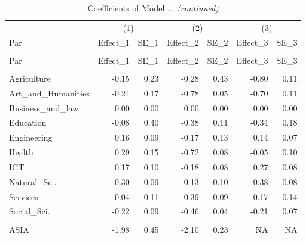 
\begin{longtable}[t]{lrrrrrr}
\caption{Coefficients of Model ...}\\
\toprule
\multicolumn{1}{c}{ } & \multicolumn{2}{c}{(1)} & \multicolumn{2}{c}{(2)} & \multicolumn{2}{c}{(3)} \\
\cmidrule(l{3pt}r{3pt}){2-3} \cmidrule(l{3pt}r{3pt}){4-5} \cmidrule(l{3pt}r{3pt}){6-7}
Par & Effect\_1 & SE\_1 & Effect\_2 & SE\_2 & Effect\_3 & SE\_3\\
\midrule
\endfirsthead
\caption[]{Coefficients of Model ... \textit{(continued)}}\\
\toprule
Par & Effect\_1 & SE\_1 & Effect\_2 & SE\_2 & Effect\_3 & SE\_3\\
\midrule
\endhead

\endfoot
\bottomrule
\endlastfoot
\addlinespace[0.3em]
\multicolumn{7}{l}{\textit{\textbf{Panel A: }}}\\
\hspace{1em}Agriculture & -0.15 & 0.23 & -0.28 & 0.43 & -0.80 & 0.11\\
\hspace{1em}Art\_and\_Humanities & -0.24 & 0.17 & -0.78 & 0.05 & -0.70 & 0.11\\
\hspace{1em}Business\_and\_law & 0.00 & 0.00 & 0.00 & 0.00 & 0.00 & 0.00\\
\hspace{1em}Education & -0.08 & 0.40 & -0.38 & 0.11 & -0.34 & 0.18\\
\hspace{1em}Engineering & 0.16 & 0.09 & -0.17 & 0.13 & 0.14 & 0.07\\
\hspace{1em}Health & 0.29 & 0.15 & -0.72 & 0.08 & -0.05 & 0.10\\
\hspace{1em}ICT & 0.17 & 0.10 & -0.18 & 0.08 & 0.27 & 0.08\\
\hspace{1em}Natural\_Sci. & -0.30 & 0.09 & -0.13 & 0.10 & -0.38 & 0.08\\
\hspace{1em}Services & -0.04 & 0.11 & -0.39 & 0.09 & -0.17 & 0.14\\
\hspace{1em}Social\_Sci. & -0.22 & 0.09 & -0.46 & 0.04 & -0.21 & 0.07\\
\addlinespace[0.3em]
\multicolumn{7}{l}{\textit{\textbf{Panel B: }}}\\
\hspace{1em}ASIA & -1.98 & 0.45 & -2.10 & 0.23 & NA & NA\\

\end{longtable}
